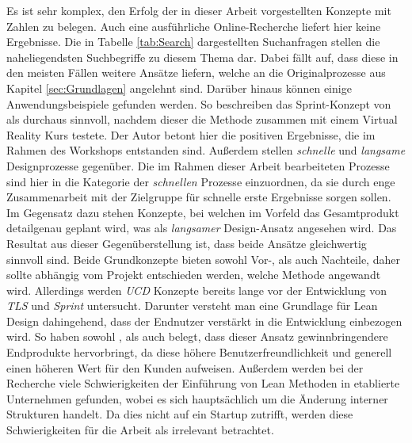 Es ist sehr komplex, den Erfolg der in dieser Arbeit vorgestellten Konzepte mit Zahlen zu belegen. Auch eine ausführliche Online-Recherche liefert hier keine Ergebnisse. Die in Tabelle \ref{tab:Search} dargestellten Suchanfragen stellen die naheliegendsten Suchbegriffe zu diesem Thema dar. Dabei fällt auf, dass diese in den meisten Fällen weitere Ansätze liefern, welche an die Originalprozesse aus Kapitel \ref{sec:Grundlagen} angelehnt sind. Darüber hinaus können einige Anwendungsbeispiele gefunden werden. So beschreiben  das Sprint-Konzept von  als durchaus sinnvoll, nachdem dieser die Methode zusammen mit einem Virtual Reality Kurs testete. Der Autor betont hier die positiven Ergebnisse, die im Rahmen des Workshops entstanden sind. Außerdem stellen  \textit{schnelle} und \textit{langsame} Designprozesse gegenüber. Die im Rahmen dieser Arbeit bearbeiteten Prozesse sind hier in die Kategorie der \textit{schnellen} Prozesse einzuordnen, da sie durch enge Zusammenarbeit mit der Zielgruppe für schnelle erste Ergebnisse sorgen sollen. Im Gegensatz dazu stehen Konzepte, bei welchen im Vorfeld das Gesamtprodukt detailgenau geplant wird, was als \textit{langsamer} Design-Ansatz angesehen wird. Das Resultat aus dieser Gegenüberstellung ist, dass beide Ansätze gleichwertig sinnvoll sind. Beide Grundkonzepte bieten sowohl Vor-, als auch Nachteile, daher sollte abhängig vom Projekt entschieden werden, welche Methode angewandt wird. Allerdings werden \textit{\ac{UCD}} Konzepte bereits lange vor der Entwicklung von \textit{\ac{TLS}} und \textit{Sprint} untersucht. Darunter versteht man eine Grundlage für Lean Design dahingehend, dass der Endnutzer verstärkt in die Entwicklung einbezogen wird. So haben \citeauthor{vredenburg2002survey} sowohl \citeyear{vredenburg2002survey}, als auch \citeyear{mao2005state} belegt, dass dieser Ansatz gewinnbringendere Endprodukte hervorbringt, da diese höhere Benutzerfreundlichkeit und generell einen höheren Wert für den Kunden aufweisen. Außerdem werden bei der Recherche viele Schwierigkeiten der Einführung von Lean Methoden in etablierte Unternehmen gefunden, wobei es sich hauptsächlich um die Änderung interner Strukturen handelt. Da dies nicht auf ein Startup zutrifft, werden diese Schwierigkeiten für die Arbeit als irrelevant betrachtet.

